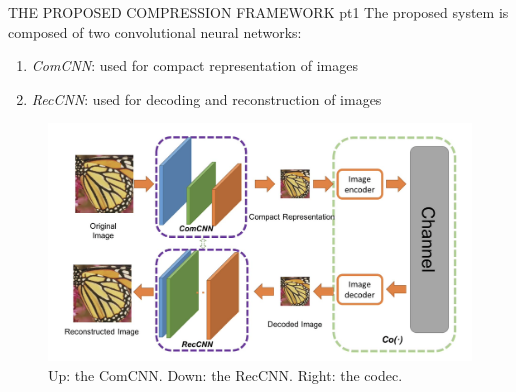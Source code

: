 \begin{frame}{THE PROPOSED COMPRESSION FRAMEWORK pt1}
    The proposed system is composed of two convolutional neural networks:
    \begin{enumerate}
        \item \emph{ComCNN}: used for compact representation of images
        \item \emph{RecCNN}: used for decoding and reconstruction of images
    \end{enumerate}
    \begin{figure}[htbp]
        \centering
        \includegraphics[width = 0.8 \linewidth]{images/paper3/framework.png}
        \centering
        \caption{Up: the ComCNN. Down: the RecCNN. Right: the codec.}
        \label{fig: framework}
    \end{figure}
\end{frame}

